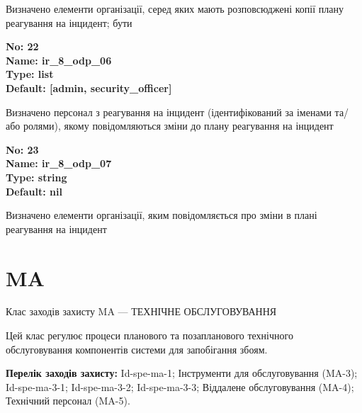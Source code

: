 \documentclass{article}
\begin{document}
{\footnotesize Визначено елементи організації, серед яких мають розповсюджені копії плану реагування на інцидент; бути}


{\footnotesize\bfseries
No: 22\\
Name: ir\_\allowbreak{}8\_\allowbreak{}odp\_\allowbreak{}06\\
Type: list\\
Default: [\textquotedbl{}admin\textquotedbl{}, \textquotedbl{}security\_\allowbreak{}officer\textquotedbl{}]
}

{\footnotesize Визначено персонал з реагування на інцидент (ідентифікований за іменами та/або ролями), якому повідомляються зміни до плану реагування на інцидент}


{\footnotesize\bfseries
No: 23\\
Name: ir\_\allowbreak{}8\_\allowbreak{}odp\_\allowbreak{}07\\
Type: string\\
Default: nil
}

{\footnotesize Визначено елементи організації, яким повідомляється про зміни в плані реагування на інцидент}




\section{MA}
Клас заходів захисту MA --- ТЕХНІЧНЕ ОБСЛУГОВУВАННЯ

Цей клас регулює процеси планового та позапланового технічного обслуговування компонентів системи для запобігання збоям.

\textbf{Перелік заходів захисту:} Id-spe-ma-1; Інструменти для обслуговування (MA-3); Id-spe-ma-3-1; Id-spe-ma-3-2; Id-spe-ma-3-3; Віддалене обслуговування (MA-4); Технічний персонал (MA-5).
\end{document}

